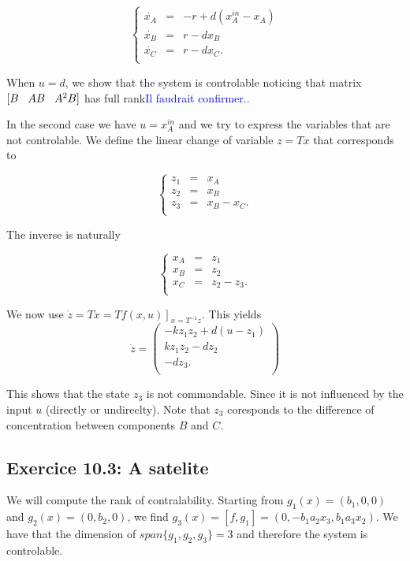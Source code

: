 $$\left\lbrace\begin{array}{ccl}
\dot{x_{A}} & = &  -r+d(x_{A}^{in}-x_{A}) \\
\dot{x_{B}} & = & r-dx_{B}  \\
\dot{x_{C}} & = & r-dx_{C}.  \\
\end{array}\right.$$

When $u=d$, we show that the system is controlable noticing that matrix $[B\hspace*{0.3cm} AB\hspace*{0.3cm} A^{2}B]$ has full rank\textcolor{blue}{Il faudrait confirmer.}.

In the second case we have $u=x_{A}^{in}$ and we try to express the variables that are not controlable.
We define the linear change of variable $z=Tx$ that corresponds to 

$$\left\lbrace\begin{array}{ccl}
z_{1} & = & x_{A} \\
z_{2} & = & x_{B} \\
z_{3} & = & x_{B}-x_{C}. \\
\end{array}\right.$$

The inverse is naturally 

$$\left\lbrace\begin{array}{ccl}
x_{A} & = & z_{1} \\
x_{B} & = & z_{2} \\
x_{C} & = & z_{2}-z_{3}. \\
\end{array}\right.$$

We now use $\dot{z}=T\dot{x}=\left.Tf(x,u)\right]_{x=T^{-1}z}$. This yields 
$$\dot{z}=\begin{pmatrix}
-kz_{1}z_{2}+d(u-z_{1})\\
kz_{1}z_{2}-dz_{2}\\
-dz_{3}.\\
\end{pmatrix}$$

This shows that the state $z_{3}$ is not commandable. Since it is not influenced by the input $u$ (directly or undireclty). Note that $z_{3}$ coresponds to the difference of concentration between components $B$ and $C$.

\subsection*{Exercice 10.3: A satelite}
We will compute the rank of contralability.
 Starting from $g_{1}(x)=(b_{1},0,0)$ and $g_{2}(x)=(0,b_{2},0)$, we find $g_{3}(x)=[f,g_{1}]=(0,-b_{1}a_{2}x_{3},b_{1}a_{3}x_{2})$. 
 We have that the dimension of $span\{g_{1},g_{2},g_{3}\}=3$ and therefore the system is controlable. 

